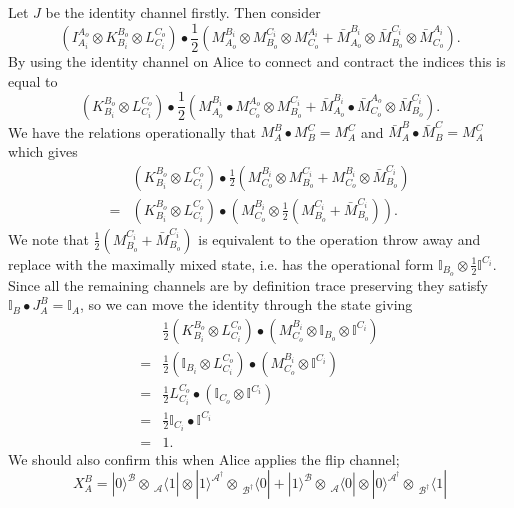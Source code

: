 \documentclass[aps,pra, twocolumn]{revtex4-1}
\begin{document}
  Let $J$ be the identity channel firstly. Then consider 
\begin{equation}
(I_{A_i}^{A_o} \otimes  K_{B_i}^{B_o} \otimes  L_{C_i}^{C_o}) \bullet  \frac{1}{2}(M_{A_o} ^{B_i}\otimes M_{B_o} ^{C_i} \otimes M_{C_o} ^{A_i} + \bar{M}_{A_o} ^{B_i} \otimes \bar{M}_{B_o} ^{C_i} \otimes \bar{M}_{C_o} ^{A_i}).
\end{equation}
By using the identity channel on Alice to connect and contract the indices this is equal to  
\begin{equation}
(K_{B_i}^{B_o} \otimes  L_{C_i}^{C_o}) \bullet  \frac{1}{2}(M_{A_o} ^{B_i} \bullet M_{C_o} ^{A_o}  \otimes M_{B_o} ^{C_i} + \bar{M}_{A_o} ^{B_i} \bullet \bar{M}_{C_o} ^{A_o} \otimes \bar{M}_{B_o} ^{C_i} ).
\end{equation}
We have the relations operationally that $M_{A} ^{B} \bullet M_{B} ^{C}=M_{A} ^{C}$ and $\bar{M}_{A} ^{B} \bullet \bar{M}_{B} ^{C}=M_{A} ^{C}$ which gives  
\begin{align}
 &(K_{B_i}^{B_o} \otimes  L_{C_i}^{C_o}) \bullet  \frac{1}{2}(M_{C_o} ^{B_i}\otimes M_{B_o} ^{C_i} + M_{C_o} ^{B_i} \otimes \bar{M}_{B_o} ^{C_i} )\\
=&  (K_{B_i}^{B_o} \otimes  L_{C_i}^{C_o}) \bullet (M_{C_o} ^{B_i}\otimes \frac{1}{2}(M_{B_o} ^{C_i} +  \bar{M}_{B_o} ^{C_i})).
\end{align}
We note that $\frac{1}{2} \left(M_{B_o} ^{C_i} +  \bar{M}_{B_o} ^{C_i}\right)$ is equivalent to the operation throw away and replace with the maximally mixed state, i.e. has the operational form $\mathbb{I}_{B_o} \otimes \frac{1}{2}\mathbb{I}^{C_i}$. Since all the remaining channels are by definition trace preserving they satisfy $\mathbb{I}_B \bullet J_A^B = \mathbb{I}_A  $, so we can move the identity through the state giving 
\begin{align}
&\frac{1}{2} (K_{B_i}^{B_o} \otimes  L_{C_i}^{C_o}) \bullet (M_{C_o} ^{B_i}\otimes \mathbb{I}_{B_o} \otimes \mathbb{I} ^{C_i} ) \nonumber \\
=&\frac{1}{2} (\mathbb{I}_{B_i} \otimes  L_{C_i}^{C_o}) \bullet (M_{C_o} ^{B_i} \otimes \mathbb{I} ^{C_i} )\nonumber\\
=&\frac{1}{2} L_{C_i}^{C_o} \bullet (\mathbb{I}_{C_o} \otimes \mathbb{I} ^{C_i} )\nonumber\\
=&\frac{1}{2} \mathbb{I}_{C_i} \bullet \mathbb{I} ^{C_i}\nonumber \\
=&1.
\end{align}
We should also confirm this when Alice applies the flip channel;
\begin{equation}
X_{A}^{B}=|0 \rangle^\mathcal{B} \! \otimes\! \,_\mathcal{A}\langle 1|\otimes |1 \rangle ^{\mathcal{A}^\dagger}\! \otimes \!\,_{\mathcal{B}^\dagger}\langle 0| + |1 \rangle^\mathcal{B} \! \otimes\! \,_\mathcal{A}\langle 0|\otimes |0 \rangle ^{\mathcal{A}^\dagger}\! \otimes \!\,_{\mathcal{B}^\dagger}\langle 1|
\end{equation}
\end{document}
